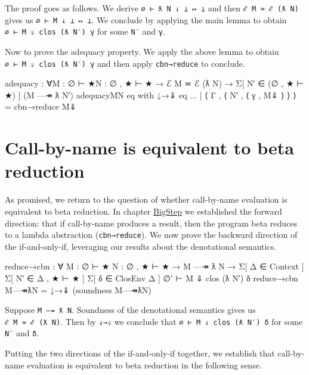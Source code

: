 The proof goes as follows. We derive \texttt{∅\ ⊢\ ƛ\ N\ ↓\ ⊥\ ↦\ ⊥} and
then \texttt{ℰ\ M\ ≃\ ℰ\ (ƛ\ N)} gives us \texttt{∅\ ⊢\ M\ ↓\ ⊥\ ↦\ ⊥}.
We conclude by applying the main lemma to obtain
\texttt{∅\ ⊢\ M\ ⇓\ clos\ (ƛ\ N′)\ γ} for some \texttt{N′} and
\texttt{γ}.

Now to prove the adequacy property. We apply the above lemma to obtain
\texttt{∅\ ⊢\ M\ ⇓\ clos\ (ƛ\ N′)\ γ} and then apply \texttt{cbn→reduce}
to conclude.

\begin{fence}
\begin{code}
adequacy : ∀{M : ∅ ⊢ ★}{N : ∅ , ★ ⊢ ★}
   →  ℰ M ≃ ℰ (ƛ N)
   → Σ[ N′ ∈ (∅ , ★ ⊢ ★) ]
     (M —↠ ƛ N′)
adequacy{M}{N} eq
    with ↓→⇓ eq
... | ⟨ Γ , ⟨ N′ , ⟨ γ , M⇓ ⟩ ⟩ ⟩ =
    cbn→reduce M⇓
\end{code}
\end{fence}

\hypertarget{call-by-name-is-equivalent-to-beta-reduction}{%
\section{Call-by-name is equivalent to beta
reduction}\label{call-by-name-is-equivalent-to-beta-reduction}}

As promised, we return to the question of whether call-by-name
evaluation is equivalent to beta reduction. In chapter
\protect\hyperlink{BigStep}{BigStep} we established the forward
direction: that if call-by-name produces a result, then the program beta
reduces to a lambda abstraction (\texttt{cbn→reduce}). We now prove the
backward direction of the if-and-only-if, leveraging our results about
the denotational semantics.

\begin{fence}
\begin{code}
reduce→cbn : ∀ {M : ∅ ⊢ ★} {N : ∅ , ★ ⊢ ★}
           → M —↠ ƛ N
           → Σ[ Δ ∈ Context ] Σ[ N′ ∈ Δ , ★ ⊢ ★ ] Σ[ δ ∈ ClosEnv Δ ]
             ∅' ⊢ M ⇓ clos (ƛ N′) δ
reduce→cbn M—↠ƛN = ↓→⇓ (soundness M—↠ƛN)
\end{code}
\end{fence}

Suppose \texttt{M\ —↠\ ƛ\ N}. Soundness of the denotational semantics
gives us \texttt{ℰ\ M\ ≃\ ℰ\ (ƛ\ N)}. Then by \texttt{↓→⇓} we conclude
that \texttt{∅\textquotesingle{}\ ⊢\ M\ ⇓\ clos\ (ƛ\ N′)\ δ} for some
\texttt{N′} and \texttt{δ}.

Putting the two directions of the if-and-only-if together, we establish
that call-by-name evaluation is equivalent to beta reduction in the
following sense.

